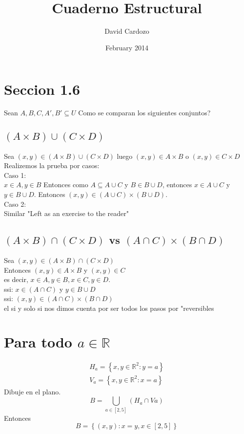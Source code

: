 \documentclass{article}
\title{Cuaderno Estructural}
\author{David Cardozo}
\date{February 2014}
\begin{document}
\maketitle


\section{Seccion 1.6}
Sean $A,B,C,A',B' \subseteq U $ Como se comparan los siguientes conjuntos?

\subsection{ $(A \times B) \cup (C \times D)$ }
Sea $(x,y) \in ( A \times B) \cup (C \times D)$ luego $(x,y) \in A \times B$ o $(x,y) \in C \times D$ \\
Realizemos la prueba por casos: \\
Caso 1: \\ 
$ x \in A, y \in B$ Entonces como $A \subseteq A \cup C$ y $B \in B \cup D$, entonces $x \in A \cup C$ y $y \in B \cup D$. Entonces $(x,y) \in (A \cup C) \times (B \cup D)$. \\
Caso 2: \\
Similar "Left as an exercise to the reader"
\subsection{$(A \times B) \cap (C \times D)$ vs $(A \cap C) \times (B \cap D)$ }
Sea $(x,y) \in (A \times B) \cap (C \times D)$ \\
Entonces $(x,y) \in A \times B$ y $(x,y) \in C$ \\
es decir, $x \in A, y \in B, x \in C, y \in D.$ \\
ssi: $x \in (A \cap C)$ y $y \in B \cup D$ \\
ssi: $(x,y) \in (A \cap C) \times (B \cap D)$ \\
el si y solo si nos dimos cuenta por ser todos los pasos por "reversibles
\section{Para todo $ a \in \mathbb{R}$ }
\begin{eqnarray}
H_{a} = \left\{ x,y \in \mathbb{R}^2 : y=a \right\} \\
V_{a} = \left\{ x,y \in \mathbb{R}^2: x=a  \right\}
\end{eqnarray}
Dibuje en el plano. 
\[
B = \bigcup _{a \in [2,5]} (H_{a} \cap V{a})
\]
Entonces 
\[
B = \left\{ (x,y): x=y, x \in [2,5] \right\}
\]
\end{document}
